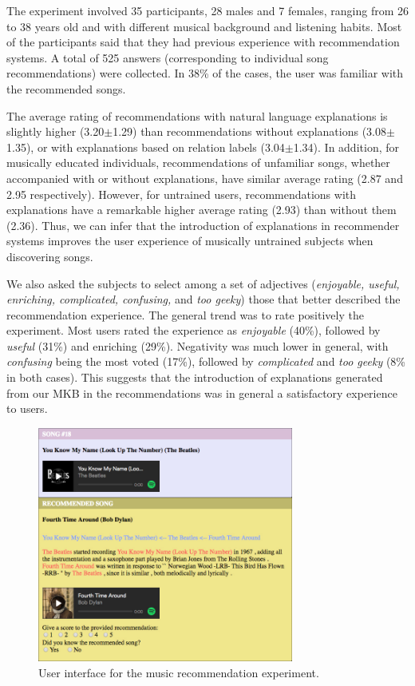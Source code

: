 The experiment involved 35 participants, 28 males and 7 females, ranging from 26 to 38 years old and with different musical background and listening habits. Most of the participants said that they had previous experience with recommendation systems. 
A total of 525 answers (corresponding to individual song recommendations) were collected. In 38\% of the cases, the user was familiar with the recommended songs.

The average rating of recommendations with natural language explanations is slightly higher (3.20$\pm$1.29) than recommendations without explanations (3.08$\pm$1.35), or with explanations based on relation labels (3.04$\pm$1.34). In addition, for musically educated individuals, recommendations of unfamiliar songs, whether accompanied with or without explanations, have similar average rating (2.87 and 2.95 respectively). However, for untrained users, recommendations with explanations have a remarkable higher average rating (2.93) than without them (2.36). Thus, we can infer that the introduction of explanations in recommender systems improves the user experience of musically untrained subjects when discovering songs.

We also asked the subjects to select among a set of adjectives (\textit{enjoyable, useful, enriching, complicated, confusing,} and \textit{too geeky}) those that better described the recommendation experience. The general trend was to rate positively the experiment. Most users rated the experience as \textit{enjoyable} (40\%), followed by \textit{useful} (31\%) and enriching (29\%). Negativity was much lower in general, with \textit{confusing} being the most voted (17\%), followed by \textit{complicated} and \textit{too geeky} (8\% in both cases). This suggests that the introduction of explanations generated from our MKB in the recommendations was in general a satisfactory experience to users.


\begin{figure}[!htp]
\centerline{
\includegraphics[width=0.75\textwidth]{ch04_kbconstruction_pics/recommender.jpg}}
\caption{User interface for the music recommendation experiment.}
\label{fig:kb:recommender}
\end{figure}

